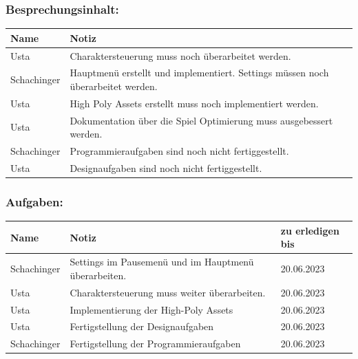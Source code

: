 \subsubsection*{Besprechungsinhalt:}
\begin{tabular}{|m{}|m{}|}
\hline
Name & Notiz \\
\hline
Usta & Charaktersteuerung muss noch überarbeitet werden. \\
\hline
Schachinger & Hauptmenü erstellt und implementiert. Settings müssen noch überarbeitet werden. \\
\hline
Usta & High Poly Assets erstellt muss noch implementiert werden. \\
\hline
Usta & Dokumentation über die Spiel Optimierung muss ausgebessert werden. \\
\hline
Schachinger & Programmieraufgaben sind noch nicht fertiggestellt. \\
\hline
Usta & Designaufgaben sind noch nicht fertiggestellt. \\
\hline
\end{tabular}

\subsubsection*{Aufgaben:}
\begin{tabular}{|m{}|m{}|m{}|}
\hline
Name & Notiz & zu erledigen bis \\
\hline
Schachinger & Settings im Pausemenü und im Hauptmenü überarbeiten. & 20.06.2023 \\
\hline
Usta & Charaktersteuerung muss weiter überarbeiten.  & 20.06.2023 \\
\hline
Usta & Implementierung der High-Poly Assets & 20.06.2023 \\
\hline
Usta & Fertigstellung der Designaufgaben & 20.06.2023 \\
\hline
Schachinger & Fertigstellung der Programmieraufgaben & 20.06.2023 \\
\hline
\end{tabular}


\pagebreak

